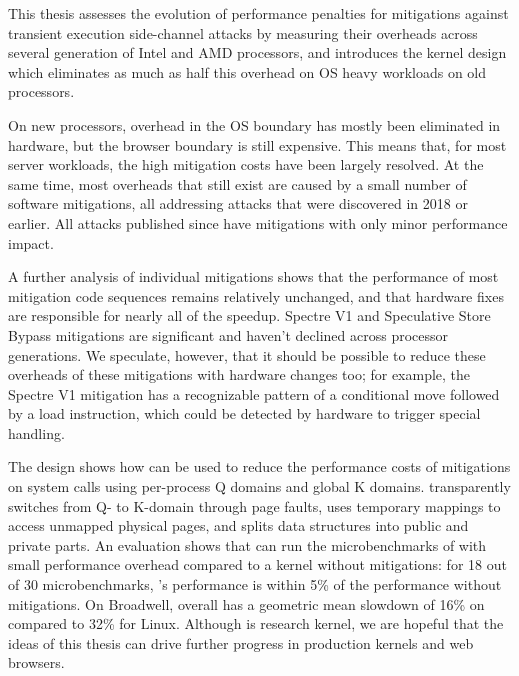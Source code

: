 \label{s:concl}

This thesis assesses the evolution of performance penalties for
mitigations against transient execution side-channel attacks by
measuring their overheads across several generation of Intel and AMD
processors, and introduces the \sys kernel design which eliminates as much
as half this overhead on OS heavy workloads on old processors.

On new processors, overhead in the OS boundary has mostly been eliminated in hardware, but the browser boundary is still expensive.
This means that, for most server workloads, the high mitigation costs have been largely resolved.
At the same time, most overheads that still exist are caused by a small number of software mitigations, all addressing attacks that were discovered in 2018 or earlier.
All attacks published since have mitigations with only minor performance impact.

A further analysis of individual mitigations shows that the performance of most mitigation code sequences remains relatively unchanged, and that hardware fixes are responsible for nearly all of the speedup.
Spectre V1 and Speculative Store Bypass mitigations are significant and haven't declined across processor generations.
We speculate, however, that it should be possible to reduce these overheads of these mitigations with hardware changes too;
for example, the Spectre V1 mitigation has a recognizable pattern of a
conditional move followed by a load instruction, which could be
detected by hardware to trigger special handling.

The \sys design
shows how \contract can be used to reduce the performance costs of
mitigations on system calls using per-process Q domains and global K
domains.  \sys transparently switches from Q- to K-domain through page
faults, uses temporary mappings to access unmapped physical pages, and
splits data structures into public and private parts.  An evaluation
shows that \sys can run the microbenchmarks of \bench with small
performance overhead compared to a kernel without mitigations: for
18 out of 30 \bench microbenchmarks, \sys's performance is within 5\%
of the performance without mitigations.
On Broadwell, \sys overall has a geometric mean slowdown of 16\% on \bench compared to 32\% for Linux.
Although \sys is research kernel, we are hopeful that the ideas of this thesis can drive further progress in production kernels and web browsers.
